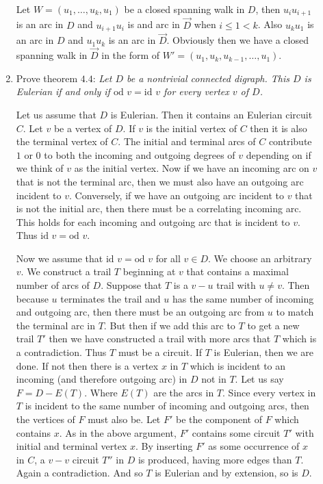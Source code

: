 \documentclass[letterpaper]{article}
\begin{document}
\begin{description}
\begin{enumerate}
Let $W=(u_1,\dots,u_k,u_1)$ be a closed spanning walk in $D$, then $u_iu_{i+1}$ is an arc in $D$ and $u_{i+1}u_i$ is and arc in $\overrightarrow D$ when $i\le 1<k$. Also $u_ku_1$ is an arc in $D$ and $u_1u_k$ is an arc in $\overrightarrow D$. Obviously then we have a closed spanning walk in $\overrightarrow D$ in the form of $W'=(u_1,u_k,u_{k-1},\dots,u_1)$. 
\setcounter{enumi}{6}
\item
Prove theorem $4.4$: {\itshape Let $D$ be a nontrivial connected digraph. This $D$ is Eulerian if and only if $\text{od } v=\text{id } v$ for every vertex $v$ of $D$.}

Let us assume that $D$ is Eulerian. Then it contains an Eulerian circuit $C$. Let $v$ be a vertex of $D$. If $v$ is the initial vertex of $C$ then it is also the terminal vertex of $C$. The initial and terminal arcs of $C$ contribute $1$ or $0$ to both the incoming and outgoing degrees of $v$ depending on if we think of $v$ as the initial vertex. Now if we have an incoming arc on $v$ that is not the terminal arc, then we must also have an outgoing arc incident to $v$. Conversely, if we have an outgoing arc incident to $v$ that is not the initial arc, then there must be a correlating incoming arc. This holds for each incoming and outgoing arc that is incident to $v$. Thus $\text{id }v=\text{od }v$.

Now we assume that $\text{id }v=\text{od }v$ for all $v\in D$. We choose an arbitrary $v$. We construct a trail $T$ beginning at $v$ that contains a maximal number of arcs of $D$. Suppose that $T$ is a $v-u$ trail with $u\ne v$. Then because $u$ terminates the trail and $u$ has the same number of incoming and outgoing arc, then there must be an outgoing arc from $u$ to match the terminal arc in $T$. But then if we add this arc to $T$ to get a new trail $T'$ then we have constructed a trail with more arcs that $T$ which is a contradiction. Thus $T$ must be a circuit. If $T$ is Eulerian, then we are done. If not then there is a vertex $x$ in $T$ which is incident to an incoming (and therefore outgoing arc) in $D$ not in $T$. Let us say $F=D-E(T)$. Where $E(T)$ are the arcs in $T$. Since every vertex in $T$ is incident to the same number of incoming and outgoing arcs, then the vertices of $F$ must also be. Let $F'$ be the component of $F$ which contains $x$. As in the above argument, $F'$ contains some circuit $T'$ with initial and terminal vertex $x$. By inserting $F'$ as some occurrence of $x$ in $C$, a $v-v$ circuit $T''$ in $D$ is produced, having more edges than $T$. Again a contradiction. And so $T$ is Eulerian and by extension, so is $D$.
\end{enumerate}
\end{description}
\end{document}
